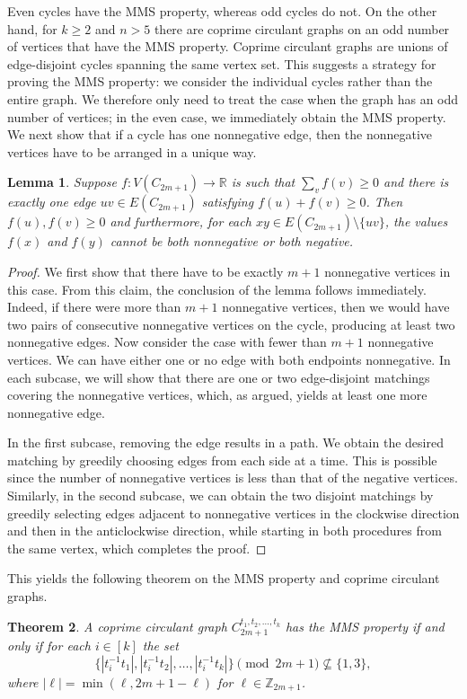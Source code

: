 \documentclass[12pt,UKenglish]{amsart}
\newtheorem{thm}{Theorem}[section]
\theoremstyle{plain}
\newtheorem{lemma}[thm]{Lemma}
\theoremstyle{definition}
\theoremstyle{remark}
\begin{document}
Even cycles have the MMS property, whereas odd cycles do not.
 On the other hand, for $k\ge2$ and $n>5$ there are coprime circulant graphs on an odd number of vertices that have the MMS property.
 Coprime circulant graphs are unions of edge-disjoint cycles spanning the same vertex set.
 This suggests a strategy for proving the MMS property: we consider the individual cycles rather than the entire graph.
 We therefore only need to treat the case when the graph has an odd number of vertices;
 in the even case, we immediately obtain the MMS property.
 We next show that if a cycle has one nonnegative edge, then the nonnegative vertices have to be arranged in a unique way.
 \begin{lemma}\label{lem:unique-cycle}
  Suppose $f:V(C_{2m+1})\rightarrow \mathbb{R}$ is such that $\sum_v f(v)\ge0$ and there is exactly one edge $uv\in E(C_{2m+1})$ satisfying $f(u)+f(v)\ge0$.
 Then $f(u),f(v)\ge0$ and furthermore, for each $xy\in E(C_{2m+1})\setminus\{uv\}$, the values $f(x)$ and $f(y)$ cannot be both nonnegative or both negative.
 \end{lemma}
\begin{proof}
We first show that there have to be exactly $m+1$ nonnegative vertices in this case.
 From this claim, the conclusion of the lemma follows immediately.
 Indeed, if there were more than $m+1$ nonnegative vertices, then we would have two pairs of consecutive nonnegative vertices on the cycle, producing at least two nonnegative edges.
 Now consider the case with fewer than $m+1$ nonnegative vertices.
 We can have either one or no edge with both endpoints nonnegative.
 In each subcase, we will show that there are one or two edge-disjoint matchings covering the nonnegative vertices, which, as argued, yields at least one more nonnegative edge.
 
 In the first subcase, removing the edge results in a path.
 We obtain the desired matching by greedily choosing edges from each side at a time.
 This is possible since the number of nonnegative vertices is less than that of the negative vertices.
 Similarly, in the second subcase, we can obtain the two disjoint matchings by greedily selecting edges adjacent to nonnegative vertices in the clockwise direction and then in the anticlockwise direction, while starting in both procedures from the same vertex, which completes the proof.
 \end{proof}
This yields the following theorem on the MMS property and coprime circulant graphs.
 \begin{thm}\label{thm:circulant}
A coprime circulant graph $C_{2m+1}^{t_1,t_2,\dots,t_k}$ has the MMS property if and only if for each $i\in [k]$ the set
\[\{ |t_i^{-1}t_1|, |t_i^{-1}t_2|,\dots, |t_i^{-1}t_k|\}\pmod{2m+1}\not\subseteq\{1,3\},\]
where $|\ell|=\min(\ell,2m+1-\ell)$ for $\ell\in\mathbb{Z}_{2m+1}$.
 \end{thm}
\end{document}
